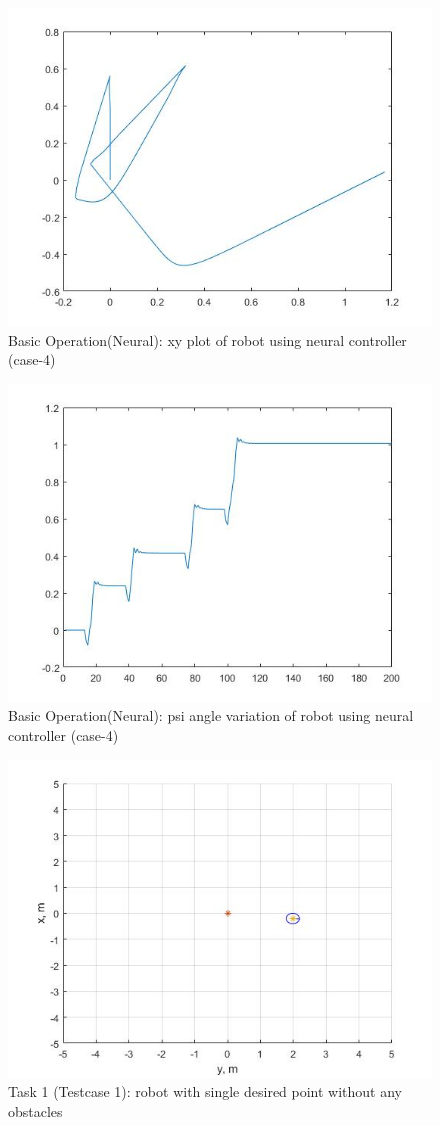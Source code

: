 \documentclass{l4proj}
\begin{document}
\begin{figure}[htb]
    \centering
    \includegraphics[width=0.5\linewidth]{images/Neuraltest4fig2.jpg}

    \caption{Basic Operation(Neural): xy plot of robot using neural controller (case-4)}
    \label{fig:Model1sim4} 
\end{figure}
\begin{figure}[htb]
    \centering
    \includegraphics[width=0.5\linewidth]{images/Neuraltest4fig4.jpg}

    \caption{Basic Operation(Neural): psi angle variation of robot using neural controller (case-4)}
    \label{fig:Model1sim4} 
\end{figure}
\begin{figure}[htb]
    \centering
    \includegraphics[width=0.5\linewidth]{images/Task1intialrobot.jpg}

    \caption{Task 1 (Testcase 1): robot with single desired point without any obstacles}
    \label{fig:Model1sim4} 
\end{figure}
\end{document}
